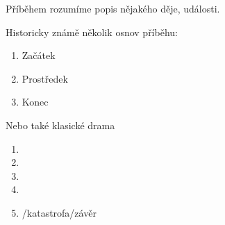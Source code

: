 \needspace{5cm} \label{příběh} Příběhem rozumíme popis nějakého děje, události. 
 
Historicky známě několik osnov příběhu: 
 
\begin{enumerate}
\item Začátek
\item Prostředek
\item Konec
\end{enumerate}
 
Nebo také klasické drama 
\begin{enumerate}
\item {}
\item {}
\item {}
\item {}
\item {}/katastrofa/závěr
\end{enumerate}
